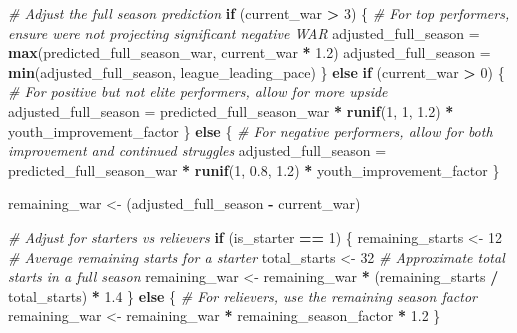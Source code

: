 \documentclass[
]{article}
\newenvironment{Shaded}{\begin{snugshade}}{\end{snugshade}}
\newcommand{\CommentTok}[1]{\textcolor[rgb]{0.56,0.35,0.01}{\textit{#1}}}
\newcommand{\ControlFlowTok}[1]{\textcolor[rgb]{0.13,0.29,0.53}{\textbf{#1}}}
\newcommand{\DecValTok}[1]{\textcolor[rgb]{0.00,0.00,0.81}{#1}}
\newcommand{\FloatTok}[1]{\textcolor[rgb]{0.00,0.00,0.81}{#1}}
\newcommand{\FunctionTok}[1]{\textcolor[rgb]{0.13,0.29,0.53}{\textbf{#1}}}
\newcommand{\NormalTok}[1]{#1}
\newcommand{\OtherTok}[1]{\textcolor[rgb]{0.56,0.35,0.01}{#1}}
\newcommand{\SpecialCharTok}[1]{\textcolor[rgb]{0.81,0.36,0.00}{\textbf{#1}}}
\begin{document}
\begin{Shaded}
\begin{Highlighting}[]
  \CommentTok{\# Adjust the full season prediction}
  \ControlFlowTok{if}\NormalTok{ (current\_war }\SpecialCharTok{\textgreater{}} \DecValTok{3}\NormalTok{) \{}
    \CommentTok{\# For top performers, ensure we\textquotesingle{}re not projecting significant negative WAR}
\NormalTok{    adjusted\_full\_season }\OtherTok{=} \FunctionTok{max}\NormalTok{(predicted\_full\_season\_war, current\_war }\SpecialCharTok{*} \FloatTok{1.2}\NormalTok{)}
\NormalTok{    adjusted\_full\_season }\OtherTok{=} \FunctionTok{min}\NormalTok{(adjusted\_full\_season, league\_leading\_pace)}
\NormalTok{  \} }\ControlFlowTok{else} \ControlFlowTok{if}\NormalTok{ (current\_war }\SpecialCharTok{\textgreater{}} \DecValTok{0}\NormalTok{) \{}
    \CommentTok{\# For positive but not elite performers, allow for more upside}
\NormalTok{    adjusted\_full\_season }\OtherTok{=}\NormalTok{ predicted\_full\_season\_war }\SpecialCharTok{*} \FunctionTok{runif}\NormalTok{(}\DecValTok{1}\NormalTok{, }\DecValTok{1}\NormalTok{, }\FloatTok{1.2}\NormalTok{) }\SpecialCharTok{*}\NormalTok{ youth\_improvement\_factor}
\NormalTok{  \} }\ControlFlowTok{else}\NormalTok{ \{}
    \CommentTok{\# For negative performers, allow for both improvement and continued struggles}
\NormalTok{    adjusted\_full\_season }\OtherTok{=}\NormalTok{ predicted\_full\_season\_war }\SpecialCharTok{*} \FunctionTok{runif}\NormalTok{(}\DecValTok{1}\NormalTok{, }\FloatTok{0.8}\NormalTok{, }\FloatTok{1.2}\NormalTok{) }\SpecialCharTok{*}\NormalTok{ youth\_improvement\_factor}
\NormalTok{  \}}
  
\NormalTok{  remaining\_war }\OtherTok{\textless{}{-}}\NormalTok{ (adjusted\_full\_season }\SpecialCharTok{{-}}\NormalTok{ current\_war)}
  
  \CommentTok{\# Adjust for starters vs relievers}
  \ControlFlowTok{if}\NormalTok{ (is\_starter }\SpecialCharTok{==} \DecValTok{1}\NormalTok{) \{}
\NormalTok{    remaining\_starts }\OtherTok{\textless{}{-}} \DecValTok{12}  \CommentTok{\# Average remaining starts for a starter}
\NormalTok{    total\_starts }\OtherTok{\textless{}{-}} \DecValTok{32}  \CommentTok{\# Approximate total starts in a full season}
\NormalTok{    remaining\_war }\OtherTok{\textless{}{-}}\NormalTok{ remaining\_war }\SpecialCharTok{*}\NormalTok{ (remaining\_starts }\SpecialCharTok{/}\NormalTok{ total\_starts) }\SpecialCharTok{*} \FloatTok{1.4}
\NormalTok{  \} }\ControlFlowTok{else}\NormalTok{ \{}
    \CommentTok{\# For relievers, use the remaining season factor}
\NormalTok{    remaining\_war }\OtherTok{\textless{}{-}}\NormalTok{ remaining\_war }\SpecialCharTok{*}\NormalTok{ remaining\_season\_factor }\SpecialCharTok{*} \FloatTok{1.2}
\NormalTok{  \}}
  

\end{Highlighting}
\end{Shaded}
\end{document}

